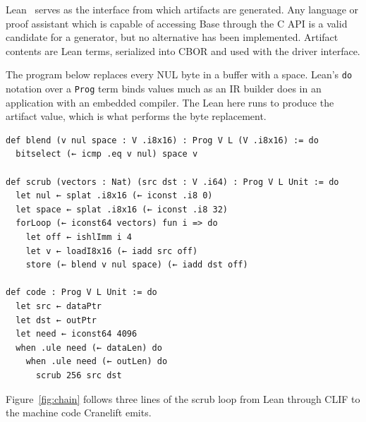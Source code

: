 \documentclass[11pt]{article}
\newenvironment{codeblock}
  {\par\noindent\begin{minipage}{\linewidth}}
  {\end{minipage}\par\noindent}
\begin{document}
Lean~\cite{lean} serves as the interface from which artifacts are generated. Any
language or proof assistant which is capable of accessing Base through the C API
is a valid candidate for a generator, but no alternative has been implemented.
Artifact contents are Lean terms, serialized into CBOR and used with the driver
interface.

The program below replaces every NUL byte in a buffer with a space. Lean's
\texttt{do} notation over a \texttt{Prog} term binds values much as an IR
builder does in an application with an embedded compiler. The Lean here runs to
produce the artifact value, which is what performs the byte replacement.

\begin{codeblock}
\begin{lstlisting}[style=code,morekeywords={def,do,let,fun}]
def blend (v nul space : V .i8x16) : Prog V L (V .i8x16) := do
  bitselect (← icmp .eq v nul) space v

def scrub (vectors : Nat) (src dst : V .i64) : Prog V L Unit := do
  let nul ← splat .i8x16 (← iconst .i8 0)
  let space ← splat .i8x16 (← iconst .i8 32)
  forLoop (← iconst64 vectors) fun i => do
    let off ← ishlImm i 4
    let v ← loadI8x16 (← iadd src off)
    store (← blend v nul space) (← iadd dst off)

def code : Prog V L Unit := do
  let src ← dataPtr
  let dst ← outPtr
  let need ← iconst64 4096
  when .ule need (← dataLen) do
    when .ule need (← outLen) do
      scrub 256 src dst
\end{lstlisting}
\end{codeblock}

Figure~\ref{fig:chain} follows three lines of the scrub loop from Lean through
CLIF to the machine code Cranelift emits.
\end{document}
